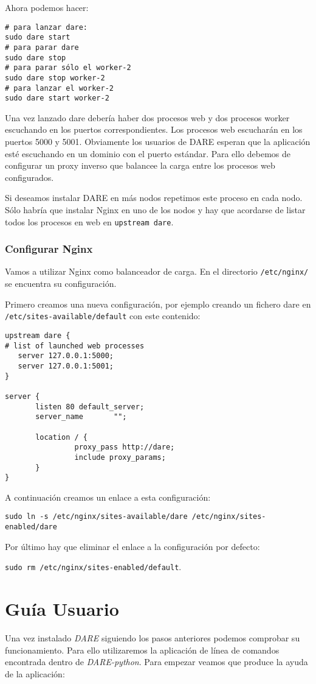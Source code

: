 Ahora podemos hacer:
\begin{verbatim}
# para lanzar dare:
sudo dare start
# para parar dare
sudo dare stop
# para parar sólo el worker-2
sudo dare stop worker-2
# para lanzar el worker-2
sudo dare start worker-2
\end{verbatim}
Una vez lanzado dare debería haber dos procesos web y dos procesos
worker escuchando en los puertos correspondientes. Los procesos web
escucharán en los puertos 5000 y 5001. Obviamente los usuarios de DARE
esperan que la aplicación esté escuchando en un dominio con el puerto
estándar. Para ello debemos de configurar un proxy inverso que balancee
la carga entre los procesos web configurados.

Si deseamos instalar DARE en más nodos repetimos este proceso en cada
nodo. Sólo habría que instalar Nginx en uno de los nodos y hay que
acordarse de listar todos los procesos en web en \verb+upstream dare+.

\subsubsection{Configurar Nginx}

Vamos a utilizar Nginx como balanceador de carga. En el directorio
\verb+/etc/nginx/+ se encuentra su configuración.

Primero creamos una nueva configuración, por ejemplo creando un
fichero dare en \verb+/etc/sites-available/default+ con este contenido:
\begin{verbatim}
upstream dare {
# list of launched web processes
   server 127.0.0.1:5000;
   server 127.0.0.1:5001;
}

server {
       listen 80 default_server;
       server_name       "";

       location / {
                proxy_pass http://dare;
                include proxy_params;
       }
}
\end{verbatim}

A continuación creamos un enlace a esta configuración:

\verb+sudo ln -s /etc/nginx/sites-available/dare /etc/nginx/sites-enabled/dare+

Por último hay que eliminar el enlace a la configuración por defecto:

\verb+sudo rm /etc/nginx/sites-enabled/default+.

\section{Guía Usuario}
\label{user_guide}
Una vez instalado \emph{DARE} siguiendo los pasos anteriores podemos
comprobar su funcionamiento. Para ello utilizaremos la aplicación de
línea de comandos encontrada dentro de \emph{DARE-python}. Para
empezar veamos que produce la ayuda de la aplicación:

